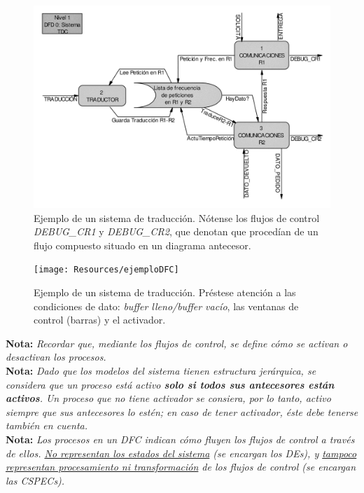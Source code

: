 \begin{figure}[H]
    \centering
    \includegraphics[width=0.8\linewidth]{Resources/Tema5/ejemploDFC_1.png}
    \caption{Ejemplo de un sistema de traducción. Nótense los flujos de control \textit{DEBUG\_CR1} y \textit{DEBUG\_CR2}, que denotan que procedían de un flujo compuesto situado en un diagrama antecesor.}
    \label{fig:ejemploCSPEC_1}
\end{figure}

\begin{figure}[H]
    \centering
    \texttt{[image: Resources/ejemploDFC]}
    \caption{Ejemplo de un sistema de traducción. Préstese atención a las condiciones de dato: \textit{buffer lleno/buffer vacío}, las ventanas de control (barras) y el activador.}
    \label{fig:ejemploCSPEC}
\end{figure}

\textbf{Nota:} \textit{Recordar que, mediante los flujos de control, se define cómo se activan o desactivan los procesos.}\\

\textbf{Nota:} \textit{Dado que los modelos del sistema tienen estructura jerárquica, se considera que un proceso está activo \textbf{solo si todos sus antecesores están activos}. Un proceso que no tiene activador se consiera, por lo tanto, activo siempre que sus antecesores lo estén; en caso de tener activador, éste debe tenerse también en cuenta.}\\

\textbf{Nota:} \textit{Los procesos en un DFC indican cómo fluyen los flujos de control a través de ellos. \uline{No representan los estados del sistema} (se encargan los DEs), y \uline{tampoco representan procesamiento ni transformación} de los flujos de control (se encargan las CSPECs).}\\

